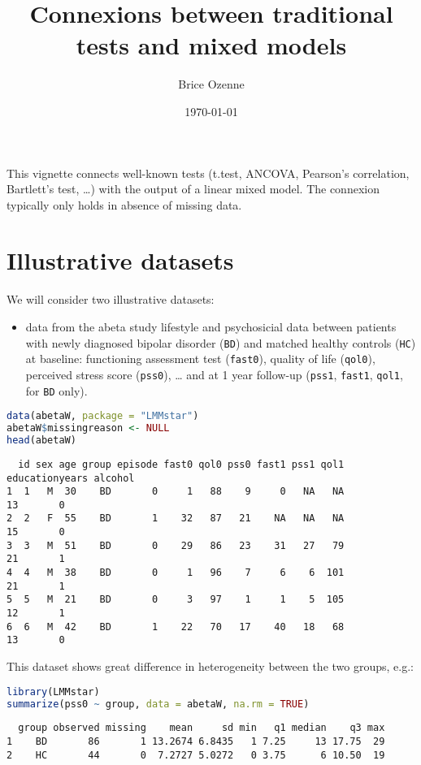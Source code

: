 \documentclass[12pt]{article}
\author{Brice Ozenne}
\date{\today}
\title{Connexions between traditional tests and mixed models}
\begin{document}
\maketitle
This vignette connects well-known tests (t.test, ANCOVA, Pearson's
correlation, Bartlett's test, \ldots) with the output of a linear
mixed model. The connexion typically only holds in absence of missing
data.
\section{Illustrative datasets}
\label{sec:orgf246c95}

We will consider two illustrative datasets:
\begin{itemize}
\item data from the abeta study lifestyle and psychosicial data between
patients with newly diagnosed bipolar disorder (\texttt{BD}) and matched
healthy controls (\texttt{HC}) at baseline: functioning assessment test
(\texttt{fast0}), quality of life (\texttt{qol0}), perceived stress score
(\texttt{pss0}), \ldots{} and at 1 year follow-up (\texttt{pss1}, \texttt{fast1}, \texttt{qol1}, for
\texttt{BD} only).
\end{itemize}
\begin{lstlisting}[language=r,numbers=none]
data(abetaW, package = "LMMstar")
abetaW$missingreason <- NULL
head(abetaW)
\end{lstlisting}

\label{}
\begin{verbatim}
  id sex age group episode fast0 qol0 pss0 fast1 pss1 qol1 educationyears alcohol
1  1   M  30    BD       0     1   88    9     0   NA   NA             13       0
2  2   F  55    BD       1    32   87   21    NA   NA   NA             15       0
3  3   M  51    BD       0    29   86   23    31   27   79             21       1
4  4   M  38    BD       0     1   96    7     6    6  101             21       1
5  5   M  21    BD       0     3   97    1     1    5  105             12       1
6  6   M  42    BD       1    22   70   17    40   18   68             13       0
\end{verbatim}


This dataset shows great difference in heterogeneity between the two groups, e.g.:
\begin{lstlisting}[language=r,numbers=none]
library(LMMstar)
summarize(pss0 ~ group, data = abetaW, na.rm = TRUE)
\end{lstlisting}

\label{}
\begin{verbatim}
  group observed missing    mean     sd min   q1 median    q3 max
1    BD       86       1 13.2674 6.8435   1 7.25     13 17.75  29
2    HC       44       0  7.2727 5.0272   0 3.75      6 10.50  19
\end{verbatim}
\end{document}
